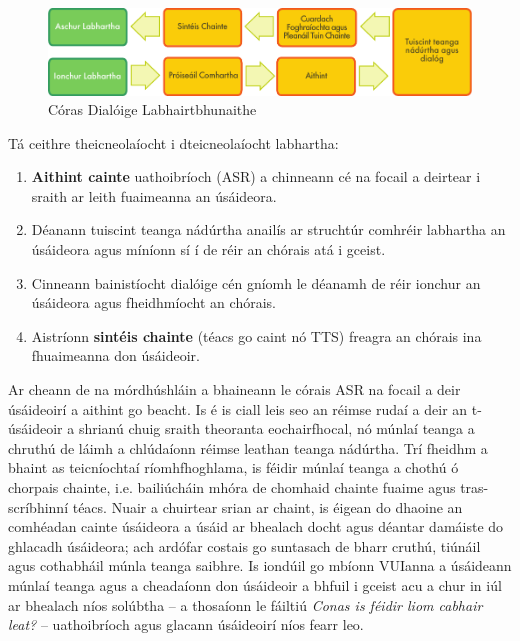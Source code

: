 \begin{multicols}{2}
\begin{figure}[htb]
  \center 
  \includegraphics[width=\textwidth]{../_media/irish/simple_speech-based_dialogue_architecture}
  \caption{Córas Dialóige Labhairtbhunaithe}
  \label{fig:dialoguearch_de}
\end{figure}

Tá ceithre theicneolaíocht i dteicneolaíocht labhartha:

\begin{enumerate}
\item \textbf {Aithint cainte} uathoibríoch (ASR) a chinneann cé na focail a deirtear i sraith ar leith fuaimeanna an úsáideora.
\item Déanann tuiscint teanga nádúrtha anailís ar struchtúr comhréir labhartha an úsáideora agus míníonn sí í de réir an chórais atá i gceist.
\item Cinneann bainistíocht dialóige cén gníomh le déanamh de réir ionchur an úsáideora agus fheidhmíocht an chórais.    
\item Aistríonn \textbf{sintéis chainte} (téacs go caint nó TTS) freagra an chórais ina fhuaimeanna don úsáideoir.
\end{enumerate}

Ar cheann de na mórdhúshláin a bhaineann le córais ASR na focail a deir úsáideoirí a aithint go beacht. Is é is ciall leis seo an réimse rudaí a deir an t-úsáideoir a shrianú chuig sraith theoranta eochairfhocal, nó múnlaí teanga a chruthú de láimh a chlúdaíonn réimse leathan teanga nádúrtha. Trí fheidhm a bhaint as teicníochtaí ríomhfhoghlama, is féidir múnlaí teanga a chothú ó chorpais chainte, i.e. bailiúcháin mhóra de chomhaid chainte fuaime agus tras-scríbhinní téacs. Nuair a chuirtear srian ar chaint, is éigean do dhaoine an comhéadan cainte úsáideora a úsáid ar bhealach docht agus déantar damáiste do ghlacadh úsáideora; ach ardófar costais go suntasach de bharr cruthú, tiúnáil agus cothabháil múnla teanga saibhre. Is iondúil go mbíonn VUIanna a úsáideann múnlaí teanga agus a cheadaíonn don úsáideoir a bhfuil i gceist acu a chur in iúl ar bhealach níos solúbtha – a thosaíonn le fáiltiú \textit{Conas is féidir liom cabhair leat?} – uathoibríoch agus glacann úsáideoirí níos fearr leo. 


\end{multicols}
